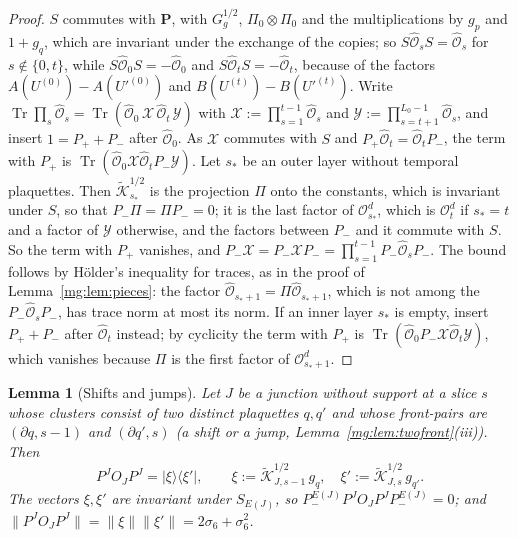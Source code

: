 \documentclass[11pt,a4paper]{article}
\newtheorem{lemma}[theorem]{Lemma}
\theoremstyle{definition}
\theoremstyle{remark}
\DeclareMathOperator{\Tr}{Tr}
\newcommand{\norm}[1]{\lVert #1\rVert}
\begin{document}
\begin{proof}
$S$ commutes with $\mathbf P$, with $G_g^{1/2}$, $\Pi_0\otimes\Pi_0$ and the multiplications by $g_p$ and $1+g_q$, which are invariant under the
exchange of the copies; so $S\hat{\mathcal O}_sS=\hat{\mathcal O}_s$ for $s\notin\{0,t\}$, while $S\hat{\mathcal O}_0S=-\hat{\mathcal O}_0$ and $S\hat{\mathcal O}_tS=-\hat{\mathcal O}_t$,
because of the factors $A(U^{(0)})-A(U'^{(0)})$ and $B(U^{(t)})-B(U'^{(t)})$. Write $\Tr\prod_s\hat{\mathcal O}_s=\Tr(\hat{\mathcal O}_0\,\mathcal X\,\hat{\mathcal O}_t\,\mathcal Y)$ with
$\mathcal X:=\prod_{s=1}^{t-1}\hat{\mathcal O}_s$ and $\mathcal Y:=\prod_{s=t+1}^{L_0-1}\hat{\mathcal O}_s$, and insert $1=P_++P_-$ after $\hat{\mathcal O}_0$. As $\mathcal X$
commutes with $S$ and $P_+\hat{\mathcal O}_t=\hat{\mathcal O}_tP_-$, the term with $P_+$ is $\Tr(\hat{\mathcal O}_0\mathcal X\hat{\mathcal O}_tP_-\mathcal Y)$. Let $s_*$ be an outer
layer without temporal plaquettes. Then $\tilde{\mathcal K}^{1/2}_{s_*}$ is the projection $\Pi$ onto the constants, which is invariant under $S$, so that
$P_-\Pi=\Pi P_-=0$; it is the last factor of $\mathcal O^d_{s_*}$, which is $\mathcal O^d_t$ if $s_*=t$ and a factor of $\mathcal Y$ otherwise, and the factors between
$P_-$ and it commute with $S$. So the term with $P_+$ vanishes, and $P_-\mathcal X=P_-\mathcal XP_-=\prod_{s=1}^{t-1}P_-\hat{\mathcal O}_sP_-$. The bound follows by
H\"older's inequality for traces, as in the proof of Lemma~\ref{mg:lem:pieces}: the factor $\hat{\mathcal O}_{s_*+1}=\Pi\hat{\mathcal O}_{s_*+1}$, which is not among the
$P_-\hat{\mathcal O}_sP_-$, has trace norm at most its norm. If an inner layer $s_*$ is empty, insert $P_++P_-$ after $\hat{\mathcal O}_t$ instead; by cyclicity the term
with $P_+$ is $\Tr(\hat{\mathcal O}_0P_-\mathcal X\hat{\mathcal O}_t\mathcal Y)$, which vanishes because $\Pi$ is the first factor of $\mathcal O^d_{s_*+1}$.
\end{proof}

\begin{lemma}[Shifts and jumps]\label{mg:lem:twoplaq}
Let $J$ be a junction without support at a slice $s$ whose clusters consist of two distinct plaquettes $q,q'$ and whose front-pairs are
$(\partial q,s-1)$ and $(\partial q',s)$ (a shift or a jump, Lemma~\ref{mg:lem:twofront}(iii)). Then
\[
P^JO_JP^J=|\xi\rangle\langle\xi'|,\qquad\xi:=\tilde{\mathcal K}^{1/2}_{J,s-1}\,g_q,\quad\xi':=\tilde{\mathcal K}^{1/2}_{J,s}\,g_{q'} .
\]
The vectors $\xi,\xi'$ are invariant under $S_{E(J)}$, so $P^{E(J)}_-P^JO_JP^JP^{E(J)}_-=0$; and $\norm{P^JO_JP^J}=\norm\xi\norm{\xi'}=2\sigma_6+\sigma_6^2$.
\end{lemma}
\end{document}
